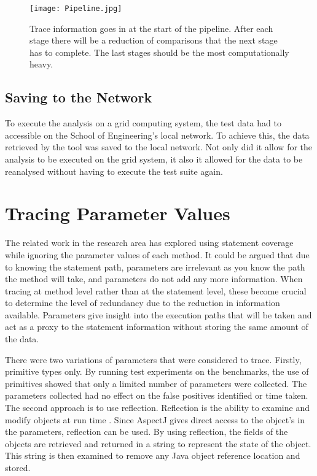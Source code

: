 \begin{figure}[h]
\texttt{[image: Pipeline.jpg]}
\caption{Trace information goes in at the start of the pipeline. After each stage there will be a reduction of comparisons that the next stage has to complete. The last stages should be the most computationally heavy.}
\label{fig:pipeline}
\end{figure}

\subsection{Saving to the Network}
To execute the analysis on a grid computing system, the test data had to accessible on the School of Engineering's local network. To achieve this, the data retrieved by the tool was saved to the local network. Not only did it allow for the analysis to be executed on the grid system, it also it allowed for the data to be reanalysed without having to execute the test suite again. 

\section{Tracing Parameter Values}
The related work in the research area has explored using statement coverage while ignoring the parameter values of each method. It could be argued that due to knowing the statement path, parameters are irrelevant as you know the path the method will take, and parameters do not add any more information. When tracing at method level rather than at the statement level, these become crucial to determine the level of redundancy due to the reduction in information available. Parameters give insight into the execution paths that will be taken and act as a proxy to the statement information without storing the same amount of the data.

There were two variations of parameters that were considered to trace. Firstly, primitive types only. By running test experiments on the benchmarks, the use of primitives showed that only a limited number of parameters were collected. The parameters collected had no effect on the false positives identified or time taken. The second approach is to use reflection. Reflection is the ability to examine and modify objects at run time \cite{oraclereflection}. Since AspectJ gives direct access to the object's in the parameters, reflection can be used. By using reflection, the fields of the objects are retrieved and returned in a string to represent the state of the object. This string is then examined to remove any Java object reference location and stored.

